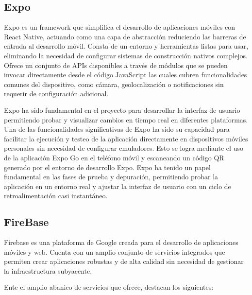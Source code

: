 \subsection{Expo}

Expo es un framework que simplifica el desarrollo de aplicaciones móviles con React Native, actuando como una capa de abstracción reduciendo las barreras de entrada al desarrollo móvil. 
Consta de un entorno y herramientas listas para usar, eliminando la necesidad de configurar sistemas de construcción nativos complejos. 
Ofrece un conjunto de APIs disponibles a través de módulos que se pueden invocar directamente desde el código JavaScript las cuales cubren funcionalidades comunes del dispositivo, como cámara, geolocalización o notificaciones sin requerir de configuración adicional. 

Expo ha sido fundamental en el proyecto para desarrollar la interfaz de usuario permitiendo probar y visualizar cambios en tiempo real en diferentes plataformas.
Una de las funcionalidades significativas de Expo ha sido su capacidad para facilitar la ejecución y testeo de la aplicación directamente en dispositivos móviles personales sin necesidad de configurar emuladores. Esto se logra mediante el uso de la aplicación Expo Go en el teléfono móvil y escaneando un código QR generado por el entorno de desarrollo Expo.
Expo ha tenido un papel fundamental en las fases de prueba y depuración, permitiendo probar la aplicación en un entorno real y ajustar la interfaz de usuario con un ciclo de retroalimentación casi instantáneo.


\subsection{FireBase}

Firebase es una plataforma de Google creada para el desarrollo de aplicaciones móviles y web.
Cuenta con un amplio conjunto de servicios integrados que permiten crear aplicaciones robustas y de alta calidad sin necesidad de gestionar la infraestructura subyacente.

Ente el amplio abanico de servicios que ofrece, destacan los siguientes:
 
